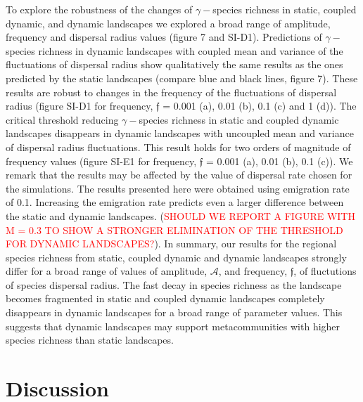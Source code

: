 \documentclass[12pt]{article}
\newcommand{\carlos}[1]{\textcolor{Red}{#1}}
\begin{document}
To explore the robustness of the changes of $\gamma-$species richness in static, coupled dynamic, and dynamic landscapes we explored a broad range of amplitude, frequency and dispersal radius values (figure 7 and SI-D1). Predictions of $\gamma-$species richness in dynamic landscapes with coupled mean and variance of the fluctuations of dispersal radius show qualitatively the same results as the ones predicted by the static landscapes (compare blue and black lines, figure 7). These results are robust to changes in the frequency of the fluctuations of dispersal radius (figure SI-D1 for frequency, $\mathfrak{f}$ = 0.001 (a), 0.01 (b), 0.1 (c) and 1 (d)). The critical threshold reducing $\gamma-$species richness in static and coupled dynamic landscapes disappears in dynamic landscapes with uncoupled mean and variance of dispersal radius fluctuations. This result holds for two orders of magnitude of frequency values (figure SI-E1 for frequency, $\mathfrak{f}$ = 0.001 (a), 0.01 (b), 0.1 (c)). We remark that the results may be affected by the value of dispersal rate chosen for the simulations. The results presented here were obtained using emigration rate of 0.1. Increasing the emigration rate predicts even a larger difference between the static and dynamic landscapes. (\carlos{SHOULD WE REPORT A FIGURE WITH M = 0.3 TO SHOW A STRONGER ELIMINATION OF THE THRESHOLD FOR DYNAMIC LANDSCAPES?}). In summary, our results for the regional species richness from static, coupled dynamic and dynamic landscapes strongly differ for a broad range of values of amplitude, $\mathcal{A}$, and frequency, $\mathfrak{f}$, of fluctutions of species dispersal radius. The fast decay in species richness as the landscape becomes fragmented in static and coupled dynamic landscapes completely disappears in dynamic landscapes for a broad range of parameter values. This suggests that dynamic landscapes may support metacommunities with higher species richness than static landscapes.

\section*{Discussion}
\end{document}
